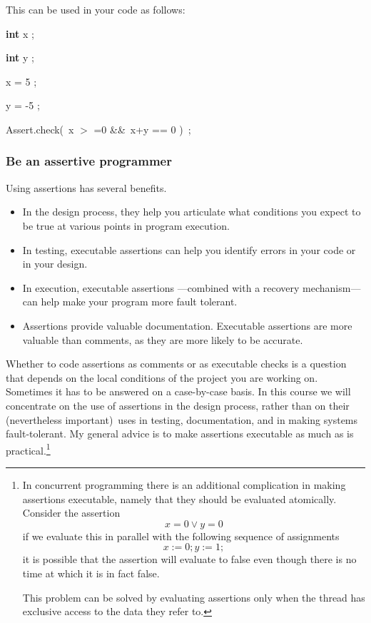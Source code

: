 \documentclass[muchmore,11pt]{article}%
\begin{document}
\noindent This can be used in your code as follows:

\begin{code}
\textbf{int} x ;

\textbf{int} y ;

x = 5 ;

y = -5 ;

Assert.check(\ x
$>$%
=0 \&\&\ x+y == 0 )\ ;
\end{code}

\subsubsection{Be an assertive programmer}

Using assertions has several benefits.

\begin{itemize}
\item In the design process, they help you articulate what conditions you
expect to be true at various points in program execution.

\item In testing, executable assertions can help you identify errors in your
code or in your design.

\item In execution, executable assertions ---combined with a recovery
mechanism--- can help make your program more fault tolerant.

\item Assertions provide valuable documentation. Executable assertions are
more valuable than comments, as they are more likely to be accurate.
\end{itemize}

Whether to code assertions as comments or as executable checks is a question
that depends on the local conditions of the project you are working on.
Sometimes it has to be answered on a case-by-case basis. In this course we
will concentrate on the use of assertions in the design process, rather than
on their (nevertheless important)\ uses in testing, documentation, and in
making systems fault-tolerant. My general advice is to make assertions
executable as much as is practical.\footnote{In concurrent programming there
is an additional complication in making assertions executable, namely that
they should be evaluated atomically. Consider the assertion%
\[
x=0\vee y=0
\]
if we evaluate this in parallel with the following sequence of assignments%
\[
x:=0;y:=1;
\]
it is possible that the assertion will evaluate to false even though there is
no time at which it is in fact false.
\par
This problem can be solved by evaluating assertions only when the thread has
exclusive access to the data they refer to.}
\end{document}

